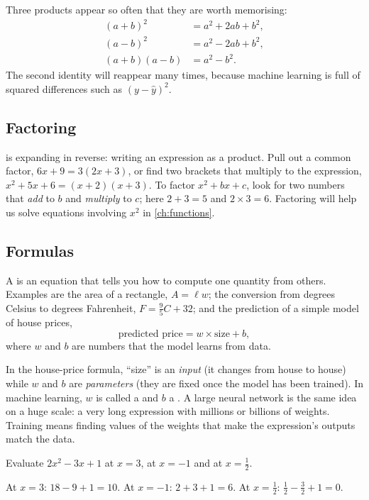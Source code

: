 Three products appear so often that they are worth memorising:
\begin{align*}
  (a+b)^2 &= a^2 + 2ab + b^2, \\
  (a-b)^2 &= a^2 - 2ab + b^2, \\
  (a+b)(a-b) &= a^2 - b^2 .
\end{align*}
The second identity will reappear many times, because machine learning is full
of squared differences such as $(y - \hat y)^2$.

\subsection{Factoring}

 is expanding in reverse: writing an expression as a product.
Pull out a common factor, $6x + 9 = 3(2x + 3)$, or find two brackets that
multiply to the expression, $x^2 + 5x + 6 = (x+2)(x+3)$. To factor
$x^2 + bx + c$, look for two numbers that \emph{add} to $b$ and
\emph{multiply} to $c$; here $2 + 3 = 5$ and $2 \times 3 = 6$. Factoring will
help us solve equations involving $x^2$ in \cref{ch:functions}.

\subsection{Formulas}

A  is an equation that tells you how to compute one quantity from
others. Examples are the area of a rectangle, $A = \ell w$; the conversion from
degrees Celsius to degrees Fahrenheit, $F = \tfrac95 C + 32$; and the
prediction of a simple model of house prices,
\[
  \text{predicted price} = w \times \text{size} + b ,
\]
where $w$ and $b$ are numbers that the model learns from data.

\begin{mlnote}
In the house-price formula, ``size'' is an \emph{input} (it changes from house
to house) while $w$ and $b$ are \emph{parameters} (they are fixed once the
model has been trained). In machine learning, $w$ is called a  and
$b$ a . A large neural network is the same idea on a huge scale: a
very long expression with millions or billions of weights. Training means
finding values of the weights that make the expression's outputs match the
data.
\end{mlnote}

\sectionexercises

\begin{exercise}
Evaluate $2x^2 - 3x + 1$ at $x = 3$, at $x = -1$ and at $x = \tfrac12$.
\end{exercise}
\begin{solution}
At $x=3$: $18 - 9 + 1 = 10$. At $x=-1$: $2 + 3 + 1 = 6$. At $x=\tfrac12$:
$\tfrac12 - \tfrac32 + 1 = 0$.
\end{solution}

